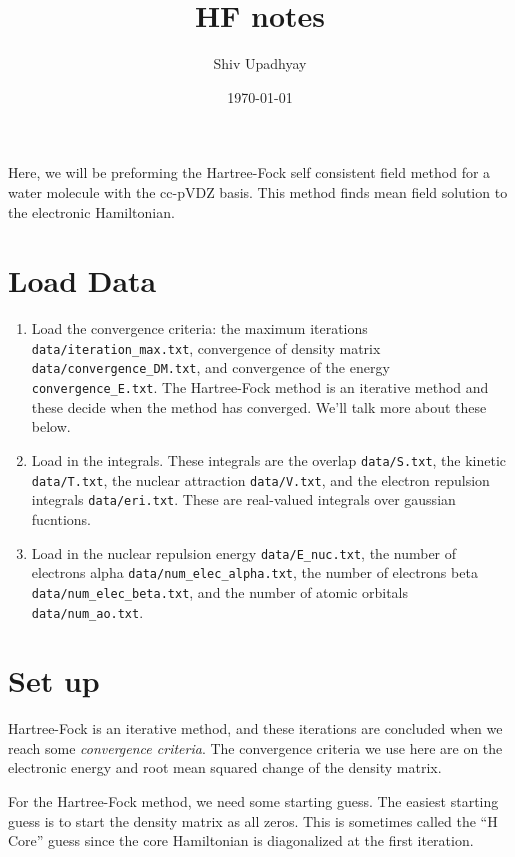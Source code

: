 \documentclass[12pt]{article}
\title{HF notes}
\date{\today}
\author{Shiv Upadhyay}
\begin{document}
\maketitle

Here, we will be preforming the Hartree-Fock self consistent field method for a water molecule with the cc-pVDZ basis. 
This method finds mean field solution to the electronic Hamiltonian. 

\section{Load Data}
\begin{enumerate}
\item Load the convergence criteria: the maximum iterations \texttt{data/iteration\_max.txt}, convergence of density matrix \texttt{data/convergence\_DM.txt}, and convergence of the energy \texttt{convergence\_E.txt}. The Hartree-Fock method is an iterative method and these decide when the method has converged. We'll talk more about these below.
\item Load in the integrals. These integrals are the overlap \texttt{data/S.txt}, the kinetic \texttt{data/T.txt}, the nuclear attraction \texttt{data/V.txt}, and the electron repulsion integrals \texttt{data/eri.txt}. These are real-valued integrals over gaussian fucntions.
\item Load in the nuclear repulsion energy \texttt{data/E\_nuc.txt}, the number of electrons alpha \texttt{data/num\_elec\_alpha.txt}, the number of electrons beta \texttt{data/num\_elec\_beta.txt}, and the number of atomic orbitals \texttt{data/num\_ao.txt}.
\end{enumerate}

\section{Set up}
Hartree-Fock is an iterative method, and these iterations are concluded when we reach some \textit{convergence criteria}. The convergence criteria we use  here are on the electronic energy and root mean squared change of the density matrix.

For the Hartree-Fock method, we need some starting guess. The easiest starting guess is to start the density matrix as all zeros. This is sometimes called the ``H Core'' guess since the core Hamiltonian is diagonalized at the first iteration.
\end{document}
